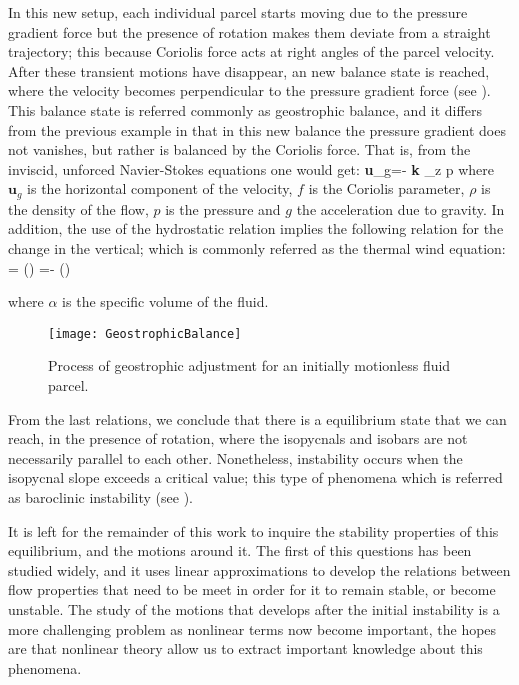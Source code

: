 In this new setup, each individual parcel starts moving due to the
pressure gradient force but the presence of rotation makes them deviate
from a straight trajectory; this because Coriolis force acts at right
angles of the parcel velocity. After these transient motions have
disappear, an new balance state is reached, where the velocity becomes
perpendicular to the pressure gradient force (see ).
This balance state is referred commonly as geostrophic balance, and it
differs from the previous example in that in this new balance the
pressure gradient does not vanishes, but rather is balanced by the
Coriolis force. That is, from the inviscid, unforced Navier-Stokes
equations one would get:
\beq
\textbf{u}_g=- \textbf{k} \times \nabla_z p
where $\textbf{u}_g$ is the horizontal component of the velocity, $f$ is
the Coriolis parameter, $\rho$ is the density of the flow, $p$ is the
pressure and $g$ the acceleration due to gravity. In addition, the use of
the hydrostatic relation implies the following relation for the change in
the vertical; which is commonly referred as the thermal wind equation:
\beq
{} = \left(\right)
\beq
{} =- \left(\right)

where $\alpha$ is the specific volume of the fluid.
\begin{figure}
\begin{center}
  \texttt{[image: GeostrophicBalance]}\\
\end{center}
  \caption{Process of geostrophic adjustment for an initially motionless fluid parcel.}
  \label{f:GBalance}
\end{figure}

From the last relations, we conclude that there is a equilibrium state
that we can reach, in the presence of rotation, where the isopycnals and
isobars are not necessarily parallel to each other. Nonetheless,
instability occurs when the isopycnal slope exceeds a critical value;
this type of phenomena which is referred as baroclinic instability (see
).

It is left for the remainder of this work to inquire the stability
properties of this equilibrium, and the motions around it. The first of
this questions has been studied widely, and it uses linear approximations
to develop the relations between flow properties that need to be meet in
order for it to remain stable, or become unstable. The study of the motions that
develops after the initial instability is a more challenging problem as
nonlinear terms now become important, the hopes are that nonlinear theory
allow us to extract important knowledge about this phenomena.

